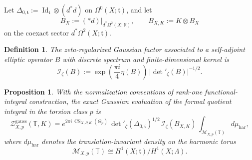 \documentclass[12pt]{amsart}
\numberwithin{equation}{section}
\newtheorem{prop}[theorem]{Proposition}
\newtheorem{definition}[theorem]{Definition}
\begin{document}
Let $\Delta_{0,\mathfrak t}:=\operatorname{Id}_{\mathfrak t}\otimes (d^*d)$ on \(\Omega^0(X;\mathfrak t)\), and let
\[
B_X:=(*d)\big|_{d^*\Omega^2(X;\mathbb R)},
\qquad
B_{X,K}:=K\otimes B_X
\]
on the coexact sector \(d^*\Omega^2(X;\mathfrak t)\).

\begin{definition}
\label{def:zeta-gaussian-factor}
The \emph{zeta-regularized Gaussian factor} associated to a self-adjoint elliptic operator
\(B\) with discrete spectrum and finite-dimensional kernel is
\[
\mathcal I_\zeta(B)
:=
\exp\!\left(\frac{\pi i}{4}\eta(B)\right)\,
\bigl|\det\nolimits'_{\zeta}(B)\bigr|^{-1/2}.
\]
\end{definition}

\begin{prop}
\label{prop:closed-gauge-reduction}
With the normalization conventions of  rank-one functional-integral construction,
the exact Gaussian evaluation of the formal quotient integral in the torsion class \(p\) is
\begin{equation}
\label{eq:closed-gauge-reduction}
\mathcal Z^{\mathrm{gauss}}_{X,p}(\mathbb T,K)
=
e^{2\pi i\,\operatorname{CS}_{X,P,K}(\Theta_p)}\,
\det\nolimits'_{\zeta}(\Delta_{0,\mathfrak t})^{1/2}\,
\mathcal I_\zeta(B_{X,K})\,
\int_{\mathcal M_{X,p}(\mathbb T)} d\mu_{\mathrm{har}},
\end{equation}
where \(d\mu_{\mathrm{har}}\) denotes the translation-invariant density on the harmonic torus
\[
\mathcal M_{X,p}(\mathbb T)
\cong
H^1(X;\mathfrak t)/H^1(X;\Lambda).
\]
\end{prop}
\end{document}
